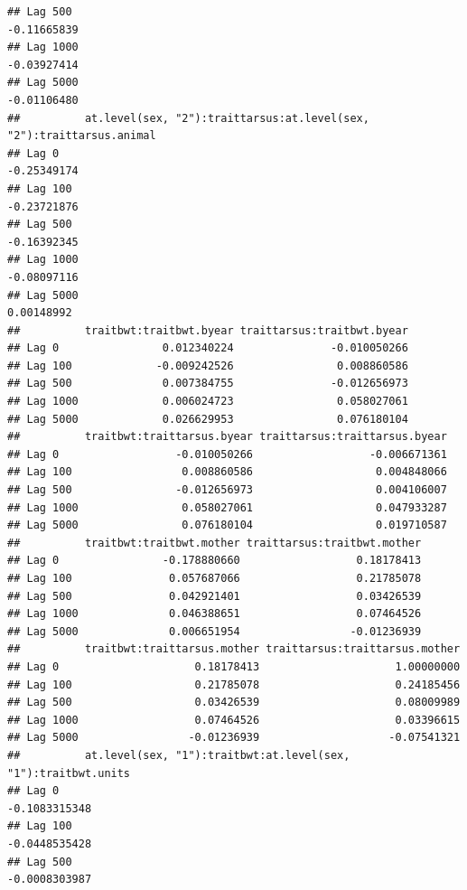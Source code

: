 \documentclass[
  12pt,
]{book}
\begin{document}
\begin{verbatim}
## Lag 500                                                        -0.11665839
## Lag 1000                                                       -0.03927414
## Lag 5000                                                       -0.01106480
##          at.level(sex, "2"):traittarsus:at.level(sex, "2"):traittarsus.animal
## Lag 0                                                             -0.25349174
## Lag 100                                                           -0.23721876
## Lag 500                                                           -0.16392345
## Lag 1000                                                          -0.08097116
## Lag 5000                                                           0.00148992
##          traitbwt:traitbwt.byear traittarsus:traitbwt.byear
## Lag 0                0.012340224               -0.010050266
## Lag 100             -0.009242526                0.008860586
## Lag 500              0.007384755               -0.012656973
## Lag 1000             0.006024723                0.058027061
## Lag 5000             0.026629953                0.076180104
##          traitbwt:traittarsus.byear traittarsus:traittarsus.byear
## Lag 0                  -0.010050266                  -0.006671361
## Lag 100                 0.008860586                   0.004848066
## Lag 500                -0.012656973                   0.004106007
## Lag 1000                0.058027061                   0.047933287
## Lag 5000                0.076180104                   0.019710587
##          traitbwt:traitbwt.mother traittarsus:traitbwt.mother
## Lag 0                -0.178880660                  0.18178413
## Lag 100               0.057687066                  0.21785078
## Lag 500               0.042921401                  0.03426539
## Lag 1000              0.046388651                  0.07464526
## Lag 5000              0.006651954                 -0.01236939
##          traitbwt:traittarsus.mother traittarsus:traittarsus.mother
## Lag 0                     0.18178413                     1.00000000
## Lag 100                   0.21785078                     0.24185456
## Lag 500                   0.03426539                     0.08009989
## Lag 1000                  0.07464526                     0.03396615
## Lag 5000                 -0.01236939                    -0.07541321
##          at.level(sex, "1"):traitbwt:at.level(sex, "1"):traitbwt.units
## Lag 0                                                    -0.1083315348
## Lag 100                                                  -0.0448535428
## Lag 500                                                  -0.0008303987

\end{verbatim}
\end{document}
